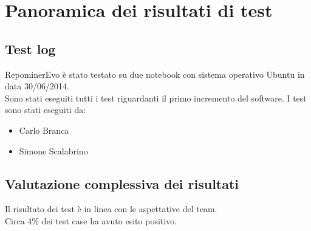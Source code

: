\chapter{Panoramica dei risultati di test}

\section{Test log}

RepominerEvo è stato testato su due notebook con sistema operativo Ubuntu in data 30/06/2014.\\
Sono stati eseguiti tutti i test riguardanti il primo incremento del software.
I test sono stati eseguiti da:
\begin{itemize}
\item Carlo Branca
\item Simone Scalabrino
\end{itemize}

\section{Valutazione complessiva dei risultati}

Il risultato dei test è in linea con le aspettative del team.\\
Circa 4\% dei test case ha avuto esito positivo.\\

\clearpage